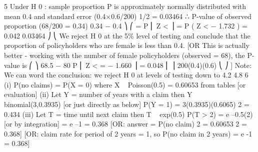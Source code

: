 \documentclass[a4paper,12pt]{article}
\begin{document}
5
Under H 0 : sample proportion P is approximately normally distributed with mean 0.4
and standard error (0.4×0.6/200) 1/2 = 0.03464
∴ P-value of observed proportion (68/200 = 0.34)
0.34 − 0.4 ⎞
⎛
= P ⎜ Z <
⎟ = P ( Z < − 1.732 ) = 0.042
0.03464 ⎠
⎝
We reject H 0 at the 5\% level of testing and conclude that the proportion of
policyholders who are female is less than 0.4.
[OR This is actually better - working with the number of female policyholders
(observed = 68), the P-value is
⎛
⎞
68.5 − 80
P ⎜ Z <
= − 1.660 ⎟ = 0.048
⎜
⎟
200(0.4)(0.6)
⎝
⎠
]
Note: We can word the conclusion: we reject H 0 at levels of testing down to 4.2%
4.8%
6
(i) P(no claims) = P(X = 0) where X ~ Poisson(0.5)
= 0.60653 from tables [or evaluation]
(ii) Let Y = number of years with a claim
then Y ~ binomial(3,0.3935) [or just directly as below]
P(Y = 1) = 3(0.3935)(0.6065) 2 = 0.434
(iii)
Let T = time until next claim
then T ~ exp(0.5)
P(T > 2) = e –0.5(2) [or by integration]
= e –1 = 0.368
[OR: answer = {P(no claim)} 2 = 0.60653 2 = 0.368]
[OR: claim rate for period of 2 years = 1, so P(no claim in 2 years)
= e -1 = 0.368]
\end{document}
